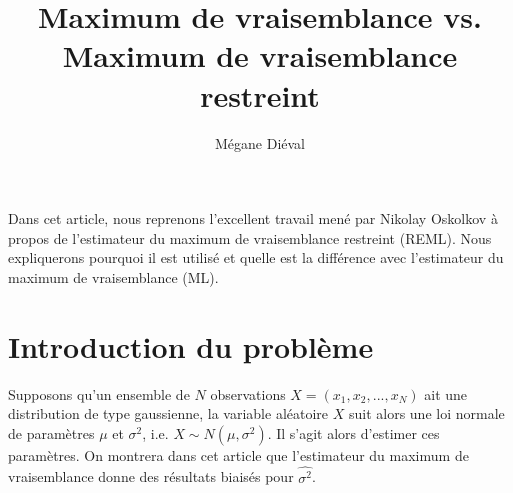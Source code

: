 \usepackage{wasysym} %

\title{Maximum de vraisemblance vs. Maximum de vraisemblance restreint}

\author{Mégane Diéval}

\date{}



\maketitle

Dans cet article, nous reprenons l'excellent travail mené par Nikolay Oskolkov à propos de l'estimateur du maximum de vraisemblance restreint (REML). Nous expliquerons pourquoi il est utilisé et quelle est la différence avec l'estimateur du maximum de vraisemblance (ML).





\section{Introduction du problème}

Supposons qu'un ensemble de $N$ observations $X = (x_1, x_2, ...,x_N)$  ait une distribution de type gaussienne, la variable aléatoire $X$ suit alors une loi normale de paramètres $\mu$ et $\sigma^2$, i.e. $X \sim N(\mu,\sigma^2)$. Il s'agit alors d'estimer ces paramètres. On montrera dans cet article que l'estimateur du maximum de vraisemblance donne des résultats biaisés pour $\hat{\sigma^2}$.

